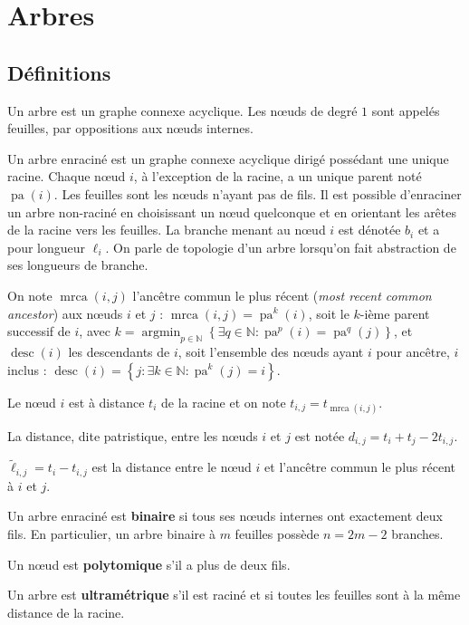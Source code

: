 \documentclass[12pt,a4paper]{reedthesis}
\newcommand \NN {\mathbb{N}}
\DeclareMathOperator*{\argmin}{argmin}
\DeclareMathOperator*{\pa}{pa}
\DeclareMathOperator*{\mrca}{mrca}
\DeclareMathOperator*{\desc}{desc}
\theoremstyle{definition}
\theoremstyle{definition}
\theoremstyle{definition}
\theoremstyle{remark}
\begin{document}
\hypertarget{arbres}{%
\chapter{Arbres}\label{arbres}}

\hypertarget{duxe9finitions}{%
\section{Définitions}\label{duxe9finitions}}

Un arbre est un graphe connexe acyclique. Les nœuds de degré \(1\) sont appelés feuilles, par oppositions aux nœuds internes.

Un arbre enraciné est un graphe connexe acyclique dirigé possédant une unique racine. Chaque nœud \(i\), à l'exception de la racine, a un unique parent noté \(\pa(i)\). Les feuilles sont les nœuds n'ayant pas de fils. Il est possible d'enraciner un arbre non-raciné en choisissant un nœud quelconque et en orientant les arêtes de la racine vers les feuilles. La branche menant au nœud \(i\) est dénotée \(b_i\) et a pour longueur \(\ell_i\). On parle de topologie d'un arbre lorsqu'on fait abstraction de ses longueurs de branche.

On note \(\mrca(i,j)\) l'ancêtre commun le plus récent (\emph{most recent common ancestor}) aux nœuds \(i\) et \(j\) : \(\mrca(i,j) = \pa^k(i)\), soit le \(k\)-ième parent successif de \(i\), avec \(k = \argmin_{p\in \NN}\left\{\exists q \in \NN : \pa^p(i) = \pa^q(j)\right\}\), et \(\desc(i)\) les descendants de \(i\), soit l'ensemble des nœuds ayant \(i\) pour ancêtre, \(i\) inclus : \(\desc(i) = \left\{j : \exists k \in \NN : \pa^k(j)=i\right\}\).

Le nœud \(i\) est à distance \(t_i\) de la racine et on note \(t_{i,j} = t_{\mrca(i,j)}\).

La distance, dite patristique, entre les nœuds \(i\) et \(j\) est notée \(d_{i,j} = t_i + t_j - 2 t_{i,j}\).

\(\tilde{\ell}_{i,j} = t_i - t_{i,j}\) est la distance entre le nœud \(i\) et l'ancêtre commun le plus récent à \(i\) et \(j\).

Un arbre enraciné est \textbf{binaire} si tous ses nœuds internes ont exactement deux fils. En particulier, un arbre binaire à \(m\) feuilles possède \(n = 2m-2\) branches.

Un nœud est \textbf{polytomique} s'il a plus de deux fils.

Un arbre est \textbf{ultramétrique} s'il est raciné et si toutes les feuilles sont à la même distance de la racine.
\end{document}
